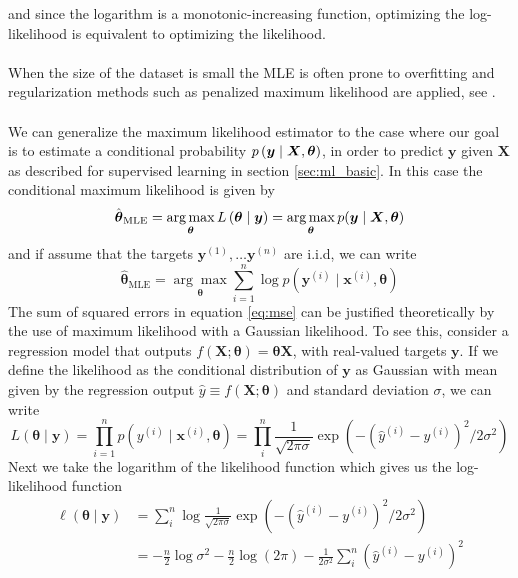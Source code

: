 and since the logarithm is a monotonic-increasing function, optimizing the log-likelihood is equivalent to optimizing the likelihood. 
\\
\\
When the size of the dataset is small the MLE is often prone to overfitting and regularization methods such as penalized maximum likelihood are applied, see \cite{hastie01statisticallearning}.
\\
\\
We can generalize the maximum likelihood estimator to the case where our goal is to estimate a conditional probability $p\left (\boldsymbol{y}\mid \boldsymbol{X},\boldsymbol{\theta}\right)$, in order to predict $\boldsymbol{y}$ given $\boldsymbol{X}$ as described for supervised learning in section \ref{sec:ml_basic}. In this case the conditional maximum likelihood is given by
\begin{equation*}
    \hat{\boldsymbol{\theta}}_{\text{MLE}}=\operatorname*{arg\,max}_{\boldsymbol{\theta}}L\left (\boldsymbol{\theta}\mid \boldsymbol{y}\right)=\operatorname*{arg\,max}_{\boldsymbol{\theta}} p(\boldsymbol{y} \mid \boldsymbol{X}, \boldsymbol{\theta})
\end{equation*}
and if assume that the targets $\boldsymbol{y}^{(1)},\ldots \boldsymbol{y}^{(n)}$ are i.i.d, we can write
\begin{equation*}
    \hat{\boldsymbol{\theta}}_{\text{MLE}}=\underset{\boldsymbol{\theta}}{\arg \max } \sum_{i=1}^{n} \log p\left(\boldsymbol{y}^{(i)} \mid \boldsymbol{x}^{(i)},\boldsymbol{\theta}\right)
\end{equation*}
The sum of squared errors in equation \ref{eq:mse} can be justified theoretically by the use of maximum likelihood with a Gaussian likelihood.
To see this, consider a regression model that outputs $f(\boldsymbol{X};\boldsymbol{\theta})=\boldsymbol{\theta}\boldsymbol{X}$, with real-valued targets $\boldsymbol{y}$. If we define the likelihood as the conditional distribution of $\boldsymbol{y}$ as Gaussian with mean given by the regression output $\hat{y}\equiv f(\boldsymbol{X};\boldsymbol{\theta})$ and standard deviation $\sigma$, we can write
\begin{equation*}
    L(\boldsymbol{\theta}\mid \boldsymbol{y})=\prod_{i=1}^{n} p\left(y^{(i)} \mid \boldsymbol{x}^{(i)} , \boldsymbol{\theta}\right)=\prod_i^n\frac{1}{\sqrt{2\pi\sigma}}\exp\left(-(\hat{y}^{(i)}-y^{(i)})^2/2\sigma^2\right)
\end{equation*}
Next we take the
logarithm of the likelihood function which gives us the log-likelihood function
\begin{equation*}
\begin{split}
        \ell(\boldsymbol{\theta}\mid \boldsymbol{y})&=\sum_i^n\log\frac{1}{\sqrt{2\pi\sigma}}\exp\left(-(\hat{y}^{(i)}-y^{(i)})^2/2\sigma^2\right)\\
        &=-\frac{n}{2} \log \sigma^{2}-\frac{n}{2} \log (2 \pi)-\frac{1}{2 \sigma^{2}} \sum_{i}^n\left(\hat{y}^{(i)}-y^{(i)}\right)^{2}
\end{split}
\end{equation*}
